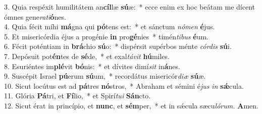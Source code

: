 3. Quia respéxit humilitátem an\textbf{cíl}læ \textbf{sú}æ: * ecce enim ex hoc beátam me dícent ómnes gene\textit{rati}\textbf{ó}nes.\\
4. Quia fécit míhi \textbf{má}gna qui \textbf{pó}tens est: * et sánctum \textit{nómen} \textbf{é}jus.\\
5. Et misericórdia éjus a progénie \textbf{in} pro\textbf{gé}nies * timén\textit{tibus} \textbf{é}um.\\
6. Fécit poténtiam in \textbf{brá}chio \textbf{sú}o: * dispérsit supérbos ménte \textit{córdis} \textbf{sú}i.\\
7. Depósuit pot\textbf{én}tes de \textbf{sé}de, * et exal\textit{távit} \textbf{hú}miles.\\
8. Esuriéntes im\textbf{plé}vit \textbf{bó}nis: * et dívites dimí\textit{sit} in\textbf{á}nes.\\
9. Suscépit Israel \textbf{pú}erum \textbf{sú}um, * recordátus misericór\textit{diæ} \textbf{sú}æ.\\
10. Sicut locútus est ad \textbf{pá}tres \textbf{nó}stros, * Abraham et sémini é\textit{jus} \textit{in} \textbf{sǽ}cula.\\
11. Glória \textbf{Pá}tri, et \textbf{Fí}lio, * et Spirí\textit{tui} \textbf{Sán}cto.\\
12. Sicut érat in princípio, et \textbf{nunc}, et \textbf{sém}per, * et in sǽcula sæcu\textit{lórum.} \textbf{A}men.
